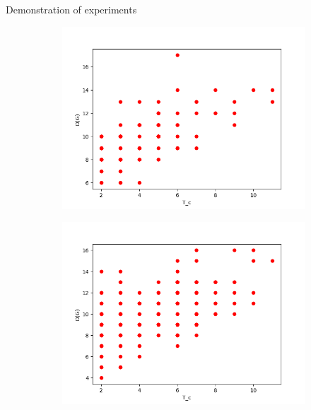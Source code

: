 \documentclass[aspectratio=43]{beamer}
\begin{document}
\begin{frame}{Demonstration of experiments}
\begin{figure}[p]
\begin{subfigure}{0.4\linewidth}
\centering\includegraphics[width=\linewidth]{images/100-consistency-convergence-weighted.png}
\end{subfigure}
\begin{subfigure}{0.4\linewidth}
\centering\includegraphics[width=\linewidth]{images/200-consistency-convergence-weighted.png}
\end{subfigure}
\begin{subfigure}{0.4\linewidth}

\end{subfigure}
\end{figure}
\end{frame}
\end{document}
